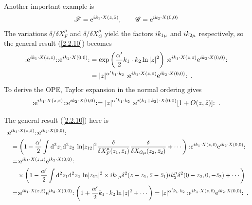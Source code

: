 Another important example is    
\begin{equation}
	\mathscr{F}=\mathrm{e}^{i k_{1} \cdot X(z, \bar{z})}, \qquad \mathscr{G}=\mathrm{e}^{i k_{2} \cdot X(0,0)}
\end{equation}
The variations $\delta / \delta X_{F}^{\mu}$ and $\delta / \delta X_{G}^{\mu}$ yield the factors $i k_{1 \mu}$ and $i k_{2 \mu}$ respectively, so the general result (\ref{2.2.10}) becomes    
\begin{align}
	:\mathrel{\mathrm{e}^{i k_{1} \cdot X(z, \bar{z})}}: : \mathrel{\mathrm{e}^{i k_{2} \cdot X(0,0)}}: 
	&=\exp \left(\frac{\alpha^{\prime}}{2} k_{1} \cdot k_{2} \ln |z|^{2}\right) :\mathrel{\mathrm{e}^{i k_{1} \cdot X(z, \bar{z})} \mathrm{e}^{i k_{2} \cdot X(0,0)}} : \nonumber \\
	&=|z|^{\alpha^{\prime} k_{1} \cdot k_{2}}: \mathrel{ \mathrm{e}^{i k_{1} \cdot X(z, \bar{z})} \mathrm{e}^{i k_{2} \cdot X(0,0)}}: \:.
	\label{2.2.13}
\end{align}
To derive the OPE, Taylor expansion in the normal ordering gives    
\begin{equation}
	:\mathrel{\mathrm{e}^{i k_{1} \cdot X(z, \bar{z})}}: : \mathrel{\mathrm{e}^{i k_{2} \cdot X(0,0)}}: 
	=|z|^{\alpha^{\prime} k_{1} \cdot k_{2}}: \mathrel{\mathrm{e}^{i(k_{1}+k_{2}) \cdot X(0,0)}[1+O(z, \bar{z})]}: \:.\label{2.2.14}
\end{equation}
\begin{tcolorbox}[breakable]
	\begin{remark}
		The general result (\ref{2.2.10}) here is    
		\begin{align*}
			&:\mathrel{ \mathrm{e}^{i k_{1} \cdot X(z,\bar{z})}}::\mathrel{\mathrm{e}^{i k_{2} \cdot X(0,0)}}:\\
			&\quad =\left(1-\frac{\alpha^{\prime}}{2} \int \mathrm{d}^{2} z_{1} \mathrm{d}^{2} z_{2}\: \ln \lvert z_{12}\rvert^{2} \frac{\delta}{\delta X_{F}^{\mu}(z_{1},\bar{z}_{1})} \frac{\delta}{\delta X_{G \mu}(z_{2}, \bar{z}_{2})} +\cdots \right):\mathrel{ \mathrm{e}^{i k_{1} \cdot X(z, \bar{z})} \mathrm{e}^{i k_{2} \cdot X(0,0)}}:\\
			&\quad =:\mathrel{\mathrm{e}^{i k_{1} \cdot X(z, \bar{z})} \mathrm{e}^{i k_{2} \cdot X(0,0)}}: \\ 
			&\quad \quad \times \left(1 -\frac{\alpha^{\prime}}{2} \int \mathrm{d}^{2} z_{1} \mathrm{d}^{2} z_{2}\: \ln \lvert z_{12}\rvert ^{2}
			\times i k_{1 \mu} \delta^{2}(z-z_{1}, \bar{z}-\bar{z}_{1}) i k_{2}^{\mu} \delta^{2}(0-z_{2}, 0,-\bar{z}_{2})+ \cdots \right)\\
			&\quad =:\mathrel{\mathrm{e}^{i k_{1} \cdot X(z, \bar{z})} \mathrm{e}^{i k_{2} \cdot X(0,0)}}: 
			\left(1+\frac{\alpha^{\prime}}{2} k_{1} \cdot k_{2} \ln |z|^{2}+\cdots\right)=
			|z|^{\alpha^{\prime} k_{1} \cdot k_{2}}: \mathrel{ \mathrm{e}^{i k_{1} \cdot X(z, \bar{z})} \mathrm{e}^{i k_{2} \cdot X(0,0)}}: \:.
		\end{align*}
	\end{remark}
\end{tcolorbox}

